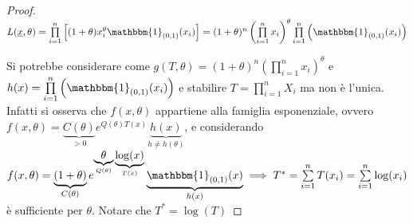 \documentclass[hidelinks, 10pt]{report}
\begin{document}
\begin{proof}
$ L(\underline{x}, \theta) = \prod\limits_{i = 1}^{n} \left[ (1 + \theta) x_i^{\theta} \mathbbm{1}_{(0,1)} (x_i) \right] = (1 + \theta)^n \left( \prod\limits_{i = 1}^{n} x_i \right)^{\theta} \prod\limits_{i = 1}^{n} \left( \mathbbm{1}_{(0,1)} (x_i) \right) $

Si potrebbe considerare come $ g(T, \theta) = (1 + \theta)^n \left( \prod\limits_{i = 1}^{n} x_i \right)^{\theta} $ e $ h(x) = \prod\limits_{i = 1}^{n} \left( \mathbbm{1}_{(0,1)} (x_i) \right) $ e stabilire $ T = \prod\limits_{i = 1}^{n} X_i $ ma non \`e l'unica. Infatti si osserva che $ f(x, \theta) $ appartiene alla famiglia esponenziale, ovvero $ f(x, \theta) = \underbrace{C(\theta)}_{> 0} e^{Q(\theta) T(x)} \underbrace{h(x)}_{h \ne h(\theta)} $, e considerando $ f(x, \theta) = \underbrace{(1 + \theta)}_{C(\theta)} e^{\underbrace{\theta}_{Q(\theta)} \underbrace{\log(x)}_{T(x)}} \underbrace{\mathbbm{1}_{(0,1)} (x)}_{h(x)} \implies T^{\ast} = \sum\limits_{i = 1}^{n} T(x_i) = \sum\limits_{i = 1}^{n} \log(x_i) $ \`e sufficiente per $ \theta $. Notare che $ T^{\ast} = \log (T) $
\end{proof}
\end{document}
